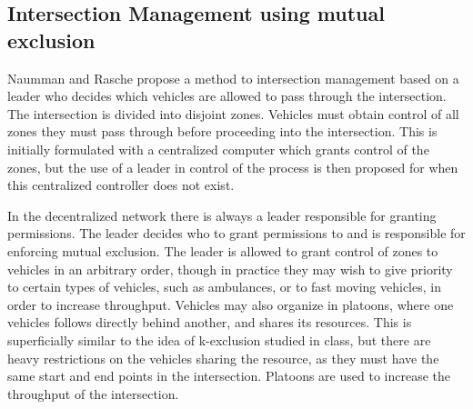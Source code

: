 \documentclass[12pt]{article}
\begin{document}
\subsection{Intersection Management using mutual exclusion}
\label{sec:tokenRing}
Naumman and Rasche propose a method to intersection management based on a leader who decides which vehicles are allowed to pass through the intersection. The intersection is divided into disjoint zones. Vehicles must obtain control of all zones they must pass through before proceeding into the intersection. This is initially formulated with a centralized computer which grants control of the zones, but the use of a leader in control of the process is then proposed for when this centralized controller does not exist.\par
In the decentralized network there is always a leader responsible for granting permissions. The leader decides who to grant permissions to and is responsible for enforcing mutual exclusion. The leader is allowed to grant control of zones to vehicles in an arbitrary order, though in practice they may wish to give priority to certain types of vehicles, such as ambulances, or to fast moving vehicles, in order to increase throughput. Vehicles may also organize in platoons, where one vehicles follows directly behind another, and shares its resources. This is superficially similar to the idea of k-exclusion studied in class, but there are heavy restrictions on the vehicles sharing the resource, as they must have the same start and end points in the intersection. Platoons are used to increase the throughput of the intersection.
\end{document}
